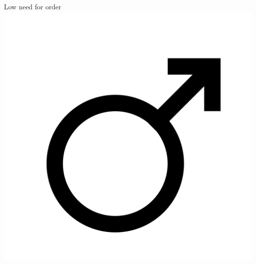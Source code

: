 \documentclass[aspectratio=169]{beamer}
\begin{document}
\begin{frame}
	  \begin{center}
		    \Huge Low need for order \\
		    \includegraphics[scale=.025]{./assets/men.png} \\
		    \small \cite{langford93}
	  \end{center}
\end{frame}
\end{document}
